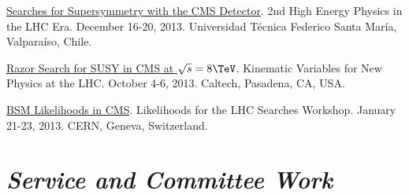 \documentclass[11pt]{res}
\newcommand{\MarginText}[1]{\section{\textit{#1}}}
\begin{document}
\begin{resume}
\begin{itemize}
{    \item \href{https://indico.cern.ch/event/252857/contributions/1579321/}{Searches for Supersymmetry with the CMS Detector}. 2nd High Energy Physics in the LHC Era. December 16-20, 2013. Universidad T\'{e}cnica Federico Santa Mar\'{i}a, Valpara\'{i}so, Chile.
    \item \href{https://indico.cern.ch/event/261650/contributions/586374/}{Razor Search for SUSY in CMS at $\sqrt{s}=8\TeV$}. Kinematic Variables for New Physics at the LHC. October 4-6, 2013. Caltech, Pasadena, CA, USA.
    \item \href{https://indico.cern.ch/event/218693/contributions/1520333/}{BSM Likelihoods in CMS}. Likelihoods for the LHC Searches Workshop. January 21-23, 2013. CERN, Geneva, Switzerland.
          }{}
  \end{itemize}


  \MarginText{Service and Committee Work}


\end{resume}
\end{document}
